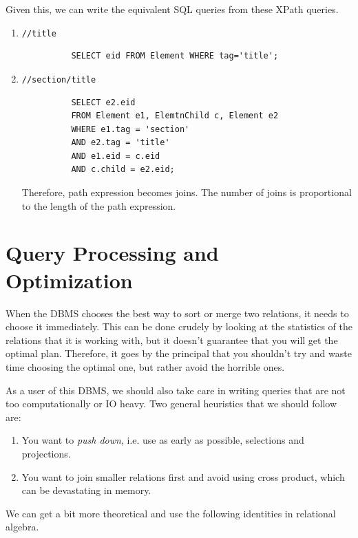 \documentclass{article}
\begin{document}
    Given this, we can write the equivalent SQL queries from these XPath queries. 
    \begin{enumerate}
      \item \texttt{//title} 
        \begin{lstlisting}
          SELECT eid FROM Element WHERE tag='title';
        \end{lstlisting}

      \item \texttt{//section/title} 
        \begin{lstlisting}
          SELECT e2.eid 
          FROM Element e1, ElemtnChild c, Element e2 
          WHERE e1.tag = 'section' 
          AND e2.tag = 'title' 
          AND e1.eid = c.eid 
          AND c.child = e2.eid;
        \end{lstlisting}
        Therefore, path expression becomes joins. The number of joins is proportional to the length of the path expression. 
    \end{enumerate}

\section{Query Processing and Optimization} 
  
    When the DBMS chooses the best way to sort or merge two relations, it needs to choose it immediately. This can be done crudely by looking at the statistics of the relations that it is working with, but it doesn't guarantee that you will get the optimal plan. Therefore, it goes by the principal that you shouldn't try and waste time choosing the optimal one, but rather avoid the horrible ones. 

    As a user of this DBMS, we should also take care in writing queries that are not too computationally or IO heavy. Two general heuristics that we should follow are: 
    \begin{enumerate}
      \item You want to \textit{push down}, i.e. use as early as possible, selections and projections. 
      \item You want to join smaller relations first and avoid using cross product, which can be devastating in memory. 
    \end{enumerate}

    We can get a bit more theoretical and use the following identities in relational algebra. 
\end{document}
